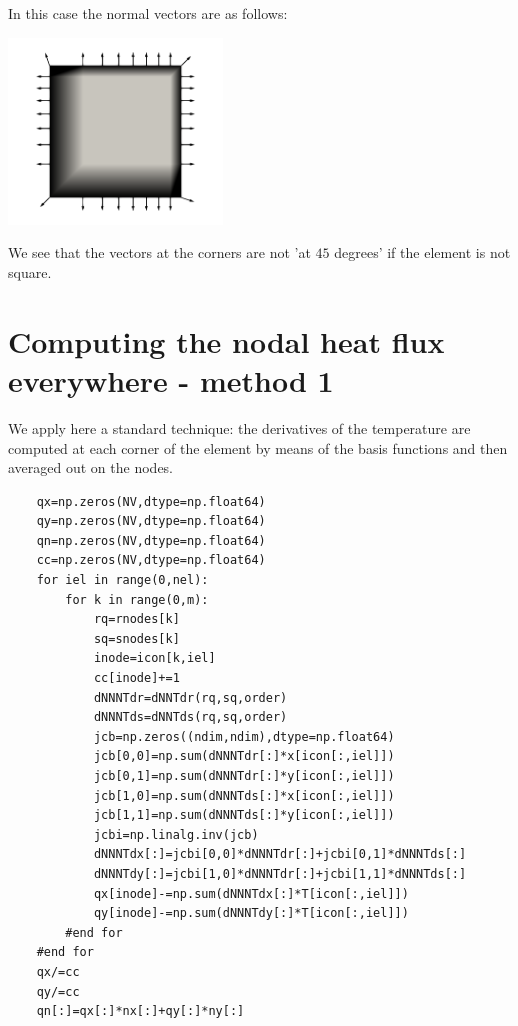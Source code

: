 In this case the normal vectors are as follows:
\begin{center}
\includegraphics[width=5.7cm]{python_codes/fieldstone_173/results/exp1/normals}
\end{center}
We see that the vectors at the corners are not 'at $45$ degrees' if the element is not square.


\section*{Computing the nodal heat flux everywhere - method 1}

We apply here a standard technique: the derivatives of the temperature 
are computed at each corner of the element by means of the basis functions
and then averaged out on the nodes.

\begin{lstlisting}
    qx=np.zeros(NV,dtype=np.float64) 
    qy=np.zeros(NV,dtype=np.float64) 
    qn=np.zeros(NV,dtype=np.float64) 
    cc=np.zeros(NV,dtype=np.float64) 
    for iel in range(0,nel):
        for k in range(0,m):
            rq=rnodes[k]
            sq=snodes[k]
            inode=icon[k,iel]
            cc[inode]+=1
            dNNNTdr=dNNTdr(rq,sq,order)
            dNNNTds=dNNTds(rq,sq,order)
            jcb=np.zeros((ndim,ndim),dtype=np.float64)
            jcb[0,0]=np.sum(dNNNTdr[:]*x[icon[:,iel]])
            jcb[0,1]=np.sum(dNNNTdr[:]*y[icon[:,iel]])
            jcb[1,0]=np.sum(dNNNTds[:]*x[icon[:,iel]])
            jcb[1,1]=np.sum(dNNNTds[:]*y[icon[:,iel]])
            jcbi=np.linalg.inv(jcb)
            dNNNTdx[:]=jcbi[0,0]*dNNNTdr[:]+jcbi[0,1]*dNNNTds[:]
            dNNNTdy[:]=jcbi[1,0]*dNNNTdr[:]+jcbi[1,1]*dNNNTds[:]
            qx[inode]-=np.sum(dNNNTdx[:]*T[icon[:,iel]])
            qy[inode]-=np.sum(dNNNTdy[:]*T[icon[:,iel]])
        #end for
    #end for
    qx/=cc
    qy/=cc
    qn[:]=qx[:]*nx[:]+qy[:]*ny[:]
\end{lstlisting}

